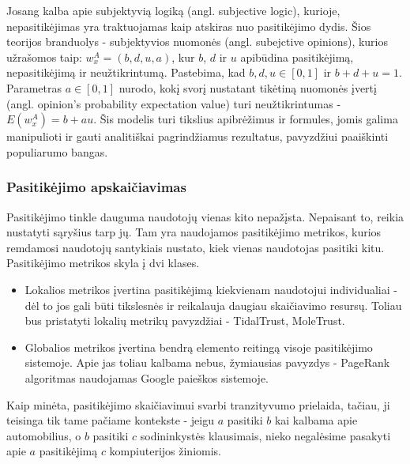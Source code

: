 \documentclass{VUMIFInfMagistrinis}
\begin{document}
\newline
\indent
Josang \cite{18} kalba apie subjektyvią logiką (angl. subjective logic), kurioje, nepasitikėjimas yra traktuojamas kaip atskiras nuo pasitikėjimo dydis. Šios teorijos branduolys - subjektyvios nuomonės (angl. subejctive opinions), kurios užrašomos taip: $w_{x}^{A} = (b,d,u,a)$, kur $b$, $d$ ir $u$ apibūdina pasitikėjimą, nepasitikėjimą ir neužtikrintumą. Pastebima, kad $b,d,u \in [0,1]$ ir $b+d+u=1$. Parametras $a \in [0,1]$ nurodo, kokį svorį nustatant tikėtiną nuomonės įvertį (angl. opinion's probability expectation value) turi neužtikrintumas - $E(w_x^A)=b+au$. Šis modelis turi tikslius apibrėžimus ir formules, jomis galima manipulioti ir gauti analitiškai pagrindžiamus rezultatus, pavyzdžiui paaiškinti populiarumo bangas. 
\subsubsection{Pasitikėjimo apskaičiavimas}\label{ssec:trust}

Pasitikėjimo tinkle dauguma naudotojų vienas kito nepažįsta. Nepaisant to, reikia nustatyti sąryšius tarp jų. Tam yra naudojamos pasitikėjimo metrikos, kurios remdamosi naudotojų santykiais nustato, kiek vienas naudotojas pasitiki kitu. Pasitikėjimo metrikos skyla į dvi klases.
\begin{itemize}
	\item Lokalios metrikos įvertina pasitikėjimą kiekvienam naudotojui individualiai - dėl to jos gali būti tikslesnės ir reikalauja daugiau skaičiavimo resursų. Toliau bus pristatyti lokalių metrikų pavyzdžiai - TidalTrust, MoleTrust.
	\item Globalios metrikos įvertina bendrą elemento reitingą visoje pasitikėjimo sistemoje. Apie jas toliau kalbama nebus, žymiausias pavyzdys - PageRank algoritmas naudojamas Google paieškos sistemoje.
\end{itemize}
Kaip minėta, pasitikėjimo skaičiavimui svarbi tranzityvumo prielaida, tačiau, ji teisinga tik tame pačiame kontekste - jeigu $a$ pasitiki $b$ kai kalbama apie automobilius, o $b$ pasitiki $c$ sodininkystės klausimais, nieko negalėsime pasakyti apie $a$ pasitikėjimą $c$ kompiuterijos žiniomis.
\end{document}
